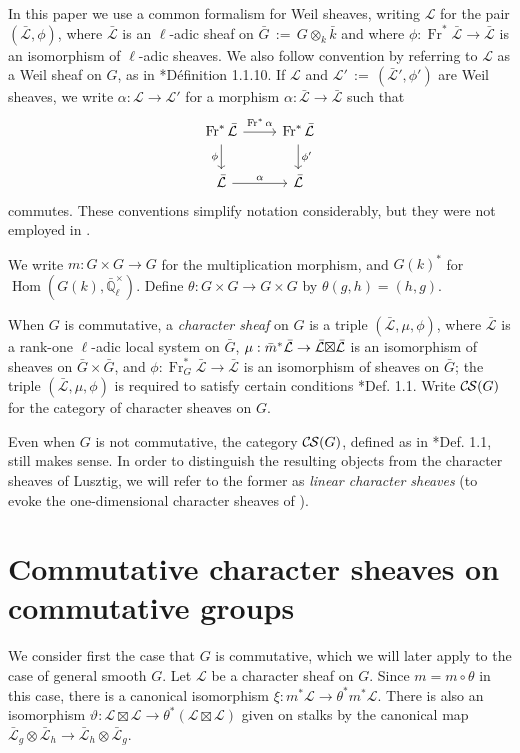 \documentclass[10pt]{amsart}
\theoremstyle{plain}
\theoremstyle{definition}
\newcommand{\EE}{\mathbb{\bar Q}_\ell}
\newcommand{\bFq}{\bar{k}}
\newcommand{\Fq}{k}
\newcommand{\EEx}{\EE^\times}
\newcommand{\Frob}[1]{\operatorname{Fr}_{#1}}
\DeclareMathOperator{\Hom}{Hom}
\newcommand{\ceq}{{\, :=\, }}
\newcommand{\cs}[1]{{\mathcal{#1}}}
\newcommand{\gcs}[1]{{\mathcal{\bar #1}}}
\newcommand{\CS}{{\mathcal{C\hskip-0.8pt S}}}
\newcommand{\bm}{\bar{m}}
\newcommand{\bG}{\bar{G}}
\newcommand{\tight}[3]{\hspace{-#1pt}{#2}\hspace{-#3pt}}
\newcommand{\LxL}{\text{$\gcs{L} \tight{0}{\boxtimes}{0} \gcs{L}$}}
\begin{document}
In this paper we use a common formalism for Weil sheaves, writing $\cs{L}$ for the pair $(\gcs{L},\phi)$, where $\gcs{L}$ is an $\ell$-adic sheaf on $\bG \ceq G\otimes_{\Fq} \bFq$ and where $\phi : \Frob{}^*\gcs{L} \to \gcs{L}$ is an isomorphism of $\ell$-adic sheaves. 
We also follow convention by referring to $\cs{L}$  as a Weil sheaf on $G$, as in \cite{Deligne:Weil}*{D\'efinition 1.1.10}.
If $\cs{L}$ and $\cs{L}' \ceq (\gcs{L}', \phi')$ are Weil sheaves, we write $\alpha : \cs{L} \to \cs{L}'$ for a morphism $\alpha : \gcs{L} \to \gcs{L}$ such that 
\[
\begin{tikzcd}
\Frob{}^* \gcs{L} \arrow{d}[swap]{\phi} \arrow{r}{\Frob{}^*\alpha} &  \Frob{}^* \gcs{L} \arrow{d}{\phi'}\\
\gcs{L} \arrow{r}{\alpha} & \gcs{L}
\end{tikzcd}
\]
commutes.  
These conventions simplify notation considerably, but they were not employed in \cite{cunningham-roe:13a}.

We write $m : G \times G \to G$ for the multiplication morphism, and $G(k)^*$ for $\Hom(G(k), \EEx)$.
Define $\theta : G\times G \to G\times G$ by $\theta(g,h) = (h,g)$.

When $G$ is commutative, a \emph{character sheaf} on $G$ is a triple $(\gcs{L}, \mu, \phi)$,
where $\gcs{L}$ is a rank-one $\ell$-adic local system on $\bG$, 
$\mu : \bm^* \gcs{L} \to \LxL$ is an isomorphism
of sheaves on $\bG \times \bG$, 
and $\phi : \Frob{G}^* \gcs{L} \to \gcs{L}$ is an isomorphism of sheaves on $\bG$;
the triple $(\gcs{L}, \mu, \phi)$ is required to satisfy certain conditions \cite{cunningham-roe:13a}*{Def. 1.1}.
Write $\CS(G)$ for the category of character sheaves on $G$.

Even when $G$ is not commutative, the category $\CS(G)$, defined as in \cite{cunningham-roe:13a}*{Def. 1.1},
still makes sense.  In order to distinguish the resulting objects from
the character sheaves of Lusztig, we will refer to the former as \emph{linear character sheaves}
(to evoke the one-dimensional character sheaves of \cite{kamgarpour:09a}).

\section{Commutative character sheaves on commutative groups}\label{sec:comcom}

We consider first the case that $G$ is commutative, which we will later apply to the case of general smooth $G$.
Let $\cs{L}$ be a character sheaf on $G$.  Since $m = m \circ \theta$ in this case,
there is a canonical isomorphism $\xi : m^* \cs{L} \to \theta^* m^* \cs{L}$.
There is also an isomorphism $\vartheta : \cs{L}\boxtimes\cs{L} \to \theta^*(\cs{L}\boxtimes\cs{L})$
given on stalks by the canonical map $\gcs{L}_{g} \otimes \gcs{L}_{h} \to \gcs{L}_{h} \otimes \gcs{L}_{g}$.
\end{document}
